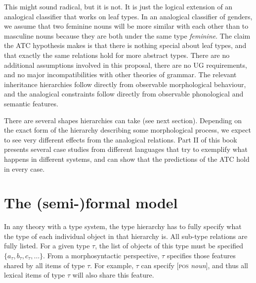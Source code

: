 This might sound radical, but it is not. It is just the logical extension of an analogical classifier that works on leaf types. In an analogical classifier of genders, we assume that two feminine nouns will be more similar with each other than to masculine nouns because they are both under the same type \textit{feminine}. The claim the ATC hypothesis makes is that there is nothing special about leaf types, and that exactly the same relations hold for more abstract types. There are no additional assumptions involved in this proposal, there are no UG requirements, and no major incompatibilities with other theories of grammar. The relevant inheritance hierarchies follow directly from observable morphological behaviour, and the analogical constraints follow directly from observable phonological and semantic features.

There are several shapes hierarchies can take (see next section). Depending on the exact form of the hierarchy describing some morphological process, we expect to see very different effects from the analogical relations. Part II of this book presents several case studies from different languages that try to exemplify what happens in different systems, and can show that the predictions of the ATC hold in every case.

\section{The (semi-)formal model}

In any theory with a type system, the type hierarchy has to fully specify what the type of each individual object in that hierarchy is. All sub-type relations are fully listed. For a given type $\tau$, the list of objects of this type must be specified $\{a_{\tau}, b_{\tau}, c_{\tau}, \dots \}$. From a morphosyntactic perspective, $\tau$ specifies those features shared by all items of type $\tau$. For example, $\tau$ can specify [\textsc{pos} \textit{noun}], and thus all lexical items of type $\tau$ will also share this feature.

